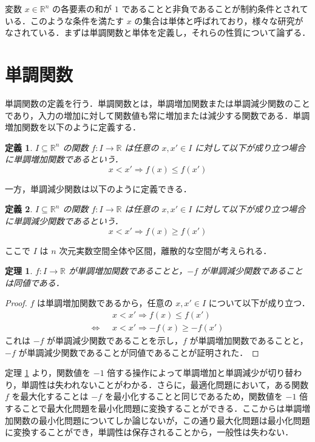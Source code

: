 \documentclass[a4paper,11pt]{jreport}
\newtheorem{definition}{定義}
\newtheorem{theorem}{定理}
\begin{document}
変数 $ x \in \mathbb{R}^n $ の各要素の和が $ 1 $ であることと非負であることが制約条件とされている．このような条件を満たす $ x $ の集合は単体と呼ばれており，様々な研究がなされている．まずは単調関数と単体を定義し，それらの性質について論ずる．\par

\section{単調関数}

単調関数の定義を行う．単調関数とは，単調増加関数または単調減少関数のことであり，入力の増加に対して関数値も常に増加または減少する関数である．単調増加関数を以下のように定義する．

\begin{definition}
$ I \subseteq \mathbb{R}^n $ の関数 $ f : I \to \mathbb{R} $ は任意の $ x, x' \in I $ に対して以下が成り立つ場合に単調増加関数であるという．
$$ x < x' \Rightarrow f(x) \leq f(x') $$
\end{definition}

一方，単調減少関数は以下のように定義できる．

\begin{definition}
$ I \subseteq \mathbb{R}^n $ の関数 $ f : I \to \mathbb{R} $ は任意の $ x, x' \in I $ に対して以下が成り立つ場合に単調減少関数であるという．
$$ x < x' \Rightarrow f(x) \geq f(x') $$
\end{definition}

ここで $ I $ は $ n $ 次元実数空間全体や区間，離散的な空間が考えられる．

\begin{theorem} \label{thm:keeping_monotonicity}
$ f : I \to \mathbb{R} $ が単調増加関数であることと，$ -f $ が単調減少関数であることは同値である．
\end{theorem}

\begin{proof}
$ f $ は単調増加関数であるから，任意の $ x, x' \in I $ について以下が成り立つ．
\begin{align*}
& x < x' \Rightarrow f(x) \leq f(x') \\
\Longleftrightarrow \hspace{8pt} & x < x' \Rightarrow -f(x) \geq -f(x')
\end{align*}
これは $ -f $ が単調減少関数であることを示し，$ f $ が単調増加関数であることと，$ -f $ が単調減少関数であることが同値であることが証明された．
\end{proof}

定理 \ref{thm:keeping_monotonicity} より，関数値を $ -1 $ 倍する操作によって単調増加と単調減少が切り替わり，単調性は失われないことがわかる．さらに，最適化問題において，ある関数 $ f $ を最大化することは $ -f $ を最小化することと同じであるため，関数値を $ -1 $ 倍することで最大化問題を最小化問題に変換することができる．ここからは単調増加関数の最小化問題についてしか論じないが，この通り最大化問題は最小化問題に変換することができ，単調性は保存されることから，一般性は失わない．\par
\end{document}
